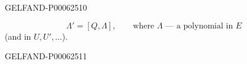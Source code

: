\begin{GelfandAdjacentEvidence}{GELFAND-P000625}{10}

\begin{equation*}
\Lambda'=[Q,\Lambda],\qquad\text{where }\Lambda\text{ --- a polynomial in }E\tag{7}
\end{equation*}
(and in \(U,U',\ldots\)).
\end{GelfandAdjacentEvidence}
\begin{GelfandAdjacentEvidence}{GELFAND-P000625}{11}

\end{GelfandAdjacentEvidence}



